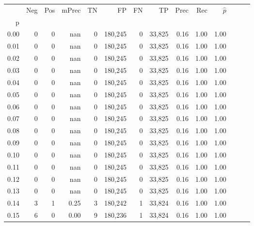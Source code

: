 \begin{tabular}{rrrrrrrrrrrrrr}
\toprule
{} &    Neg &    Pos & mPrec &       TN &       FP &      FN &      TP &  Prec &   Rec & $\hat{p}$ \\
p    &        &        &       &          &          &         &         &       &       &           \\
\midrule
0.00 &      0 &      0 &   nan &        0 &  180,245 &       0 &  33,825 &  0.16 &  1.00 &      1.00 \\
0.01 &      0 &      0 &   nan &        0 &  180,245 &       0 &  33,825 &  0.16 &  1.00 &      1.00 \\
0.02 &      0 &      0 &   nan &        0 &  180,245 &       0 &  33,825 &  0.16 &  1.00 &      1.00 \\
0.03 &      0 &      0 &   nan &        0 &  180,245 &       0 &  33,825 &  0.16 &  1.00 &      1.00 \\
0.04 &      0 &      0 &   nan &        0 &  180,245 &       0 &  33,825 &  0.16 &  1.00 &      1.00 \\
0.05 &      0 &      0 &   nan &        0 &  180,245 &       0 &  33,825 &  0.16 &  1.00 &      1.00 \\
0.06 &      0 &      0 &   nan &        0 &  180,245 &       0 &  33,825 &  0.16 &  1.00 &      1.00 \\
0.07 &      0 &      0 &   nan &        0 &  180,245 &       0 &  33,825 &  0.16 &  1.00 &      1.00 \\
0.08 &      0 &      0 &   nan &        0 &  180,245 &       0 &  33,825 &  0.16 &  1.00 &      1.00 \\
0.09 &      0 &      0 &   nan &        0 &  180,245 &       0 &  33,825 &  0.16 &  1.00 &      1.00 \\
0.10 &      0 &      0 &   nan &        0 &  180,245 &       0 &  33,825 &  0.16 &  1.00 &      1.00 \\
0.11 &      0 &      0 &   nan &        0 &  180,245 &       0 &  33,825 &  0.16 &  1.00 &      1.00 \\
0.12 &      0 &      0 &   nan &        0 &  180,245 &       0 &  33,825 &  0.16 &  1.00 &      1.00 \\
0.13 &      0 &      0 &   nan &        0 &  180,245 &       0 &  33,825 &  0.16 &  1.00 &      1.00 \\
0.14 &      3 &      1 &  0.25 &        3 &  180,242 &       1 &  33,824 &  0.16 &  1.00 &      1.00 \\
0.15 &      6 &      0 &  0.00 &        9 &  180,236 &       1 &  33,824 &  0.16 &  1.00 &      1.00 \\

\end{tabular}
